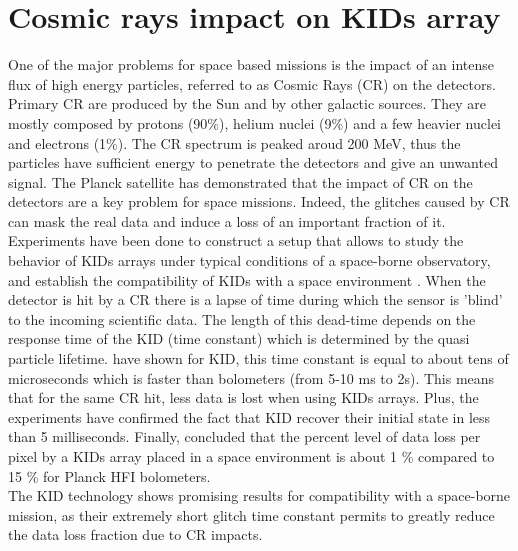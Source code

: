 \section{Cosmic rays impact on KIDs array}

One of the major problems for space based missions is the impact of an intense flux of high energy particles, referred to as Cosmic Rays (CR) on the detectors. Primary CR are produced by the Sun and by other galactic sources. They are mostly composed by protons (90\%), helium nuclei (9\%) and a few heavier nuclei and electrons (1\%). The CR spectrum is peaked aroud 200 MeV, thus the particles have sufficient energy to penetrate the detectors and give an unwanted signal. The Planck satellite \citep{2014A&A...571A..10P} has demonstrated that the impact of CR on the detectors are a key problem for space missions. Indeed, the glitches caused by CR can mask the real data and induce a loss of an important fraction of it.\\
Experiments have been done to construct a setup that allows to study the behavior of KIDs arrays under typical conditions of a space-borne observatory, and establish the compatibility of KIDs with a space environment \citep{2016A&A...592A..26C,2016SPIE.9914E..0NM}. When the detector is hit by a CR there is a lapse of time during which the sensor is 'blind' to the incoming scientific data. The length of this dead-time depends on the response time of the KID (time constant) which is determined by the quasi particle lifetime. \citet{2012ApPhL.100w2601M} have shown for KID, this time constant is equal to about tens of microseconds which is faster than bolometers (from 5-10 ms to 2s). This means that for the same CR hit, less data is lost when using KIDs arrays. Plus, the experiments have confirmed the fact that KID recover their initial state in less than 5 milliseconds. Finally, \citet{2016SPIE.9914E..0NM} concluded that the percent level of data loss per pixel by a KIDs array placed in a space environment is about 1 \% compared to 15 \% for Planck HFI bolometers.\\ The KID technology shows promising results for compatibility with a space-borne mission, as their extremely short glitch time constant permits to greatly reduce the data loss fraction due to CR impacts. 

